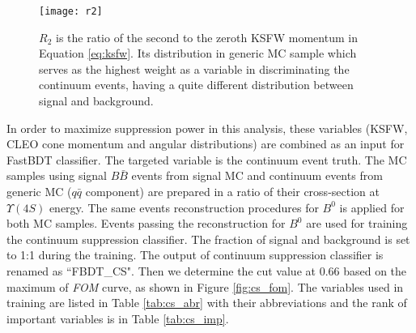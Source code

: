 \begin{figure}[H]
	\centering
	\texttt{[image: r2]}
	\caption{$R_2$ is the ratio of the second to the zeroth KSFW momentum in Equation \ref{eq:ksfw}. Its distribution in generic MC sample which serves as the highest weight as a variable in discriminating the continuum events, having a quite different distribution between signal and background.}
	\label{fig:R2}
\end{figure}



  In order to maximize suppression power in this analysis, these variables (KSFW, CLEO cone momentum and angular distributions) are combined as an input for FastBDT classifier. The targeted variable is the continuum event truth. The MC samples using signal $B\bar{B}$ events from signal MC and continuum events from generic MC ($q\bar{q}$ component) are prepared in a ratio of their cross-section at $\Upsilon{(4S)}$ energy. The same events reconstruction procedures for $B^0$ is applied for both MC samples. Events passing the reconstruction for $B^0$ are used for training the continuum suppression classifier. The fraction of signal and background is set to 1:1 during the training.  The output of continuum suppression classifier is renamed as ``FBDT\_CS". Then we determine the cut value at 0.66 based on the maximum of \textit{FOM} curve, as shown in Figure \ref{fig:cs_fom}. The variables used in training are listed in Table \ref{tab:cs_abr} with their abbreviations and the rank of important variables is in Table \ref{tab:cs_imp}.

